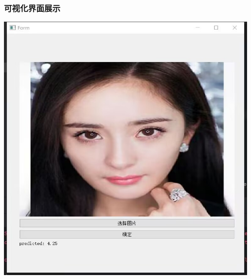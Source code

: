 \documentclass{article}
\begin{document}
\subsubsection{可视化界面展示}
\includegraphics[width=0.98\textwidth]{0.png}






{\small}
\end{document}
